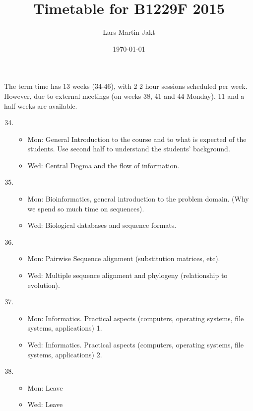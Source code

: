 \documentclass{article}
\title{Timetable for B1229F 2015}
\author{Lars Martin Jakt}
\date{\today}
\begin{document}
\maketitle

\setcounter{tocdepth}{3}
\tableofcontents
\vspace*{1cm}

The term time has 13 weeks (34-46), with 2 2 hour sessions scheduled per week.
However, due to external meetings (on weeks 38, 41 and 44 Monday), 
11 and a half weeks are available.

\begin{enumerate}
\setcounter{enumi}{33}
\item 
\begin{itemize}
\item Mon: General Introduction to the course and to what
     is expected of the students. Use second half to understand the students' background.
\item Wed: Central Dogma and the flow of information.
\end{itemize}
\item 
\begin{itemize}
\item Mon: Bioinformatics, general introduction to the problem domain. (Why we spend so much time on sequences).
\item Wed: Biological databases and sequence formats.
\end{itemize}
\item 
\begin{itemize}
\item Mon: Pairwise Sequence alignment (substitution matrices, etc).
\item Wed: Multiple sequence alignment and phylogeny (relationship to evolution).
\end{itemize}
\item 
\begin{itemize}
\item Mon: Informatics. Practical aspects (computers, operating systems, file systems, applications) 1.
\item Wed: Informatics. Practical aspects (computers, operating systems, file systems, applications) 2.
\end{itemize}
\item 
\begin{itemize}
\item Mon: Leave
\item Wed: Leave
\end{itemize}

\end{enumerate}
\end{document}
